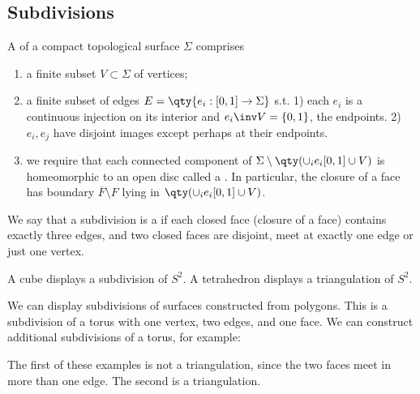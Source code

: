 \subsection{Subdivisions}

\begin{definition}[Subdivision]
	A  of a compact topological surface $\Sigma$ comprises
	\begin{enumerate}
		\item a finite subset $V \subset \Sigma$ of vertices;
		\item a finite subset of edges $E = \qty{e_i : [0,1] \to \Sigma}$ s.t. 1) each $e_i$ is a continuous injection on its interior and $e_i\inv V = \{0, 1\}$, the endpoints.
		2) $e_i, e_j$ have disjoint images except perhaps at their endpoints.
		\item we require that each connected component of $\Sigma \setminus \qty(\cup_i e_i [0, 1] \cup V)$ is homeomorphic to an open disc called a .
		      In particular, the closure of a face has boundary $\overline F \setminus F$ lying in $\qty(\cup_i e_i [0, 1] \cup V)$.
	\end{enumerate}
\end{definition}

\begin{definition}[Triangulation]
	We say that a subdivision is a  if each closed face (closure of a face) contains exactly three edges, and two closed faces are disjoint, meet at exactly one edge or just one vertex.
\end{definition} 

\begin{example}
	A cube displays a subdivision of $S^2$.
	A tetrahedron displays a triangulation of $S^2$.
\end{example}

\begin{example}
	We can display subdivisions of surfaces constructed from polygons.
	This is a subdivision of a torus with one vertex, two edges, and one face.
	We can construct additional subdivisions of a torus, for example:
	\begin{center}
		 \quad {}
	\end{center}
	The first of these examples is not a triangulation, since the two faces meet in more than one edge.
	The second is a triangulation.
\end{example}


